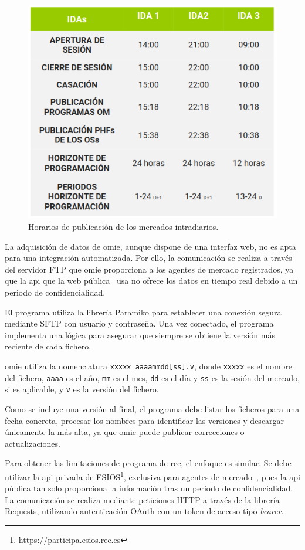 \begin{figure}
  \centering
  \includegraphics[width=0.5\linewidth]{figures/horarios-publicacion.png}
  \caption[Horarios de publicación de mercados intradiarios.]{Horarios de publicación de los mercados intradiarios.}%
  \label{fig:horarios-publicacion}
\end{figure}

La adquisición de datos de \gls{omie}, aunque dispone de una interfaz web, no es apta para una integración automatizada. Por ello, la comunicación se realiza a través del servidor FTP que \gls{omie} proporciona a los agentes de mercado registrados, ya que la \gls{api} que la web pública~\cite{omie2025acceso} usa no ofrece los datos en tiempo real debido a un periodo de confidencialidad.

El programa utiliza la librería Paramiko para establecer una conexión segura mediante SFTP con usuario y contraseña. Una vez conectado, el programa implementa una lógica para asegurar que siempre se obtiene la versión más reciente de cada fichero.

\Gls{omie} utiliza la nomenclatura \texttt{xxxxx\_aaaammdd[ss].v}, donde \texttt{xxxxx} es el nombre del fichero, \texttt{aaaa} es el año, \texttt{mm} es el mes, \texttt{dd} es el día y \texttt{ss} es la sesión del mercado, si es aplicable, y \texttt{v} es la versión del fichero.

Como se incluye una versión al final, el programa debe listar los ficheros para una fecha concreta, procesar los nombres para identificar las versiones y descargar únicamente la más alta, ya que \gls{omie} puede publicar correcciones o actualizaciones.

Para obtener las limitaciones de programa de \gls{ree}, el enfoque es similar. Se debe utilizar la \gls{api} privada de ESIOS\footnote{\url{https://participa.esios.ree.es}}, exclusiva para agentes de mercado~\cite{red2025esios}, pues la \gls{api} pública tan solo proporciona la información tras un periodo de confidencialidad. La comunicación se realiza mediante peticiones HTTP a través de la librería Requests, utilizando autenticación OAuth con un token de acceso tipo \textit{bearer}.

